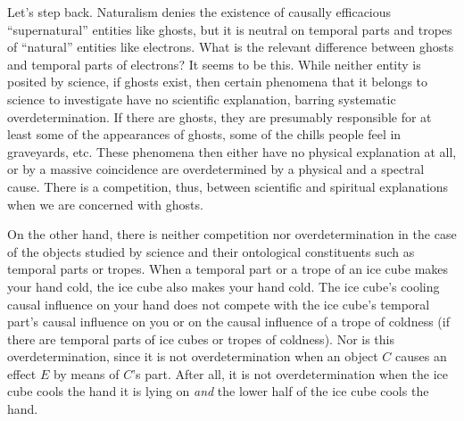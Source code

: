 Let's step back. Naturalism denies the existence of causally efficacious ``supernatural'' entities like 
ghosts, but it is neutral on temporal parts and tropes of ``natural'' entities like electrons. 
What is the relevant difference between ghosts and temporal parts of electrons? It seems to be this. While
neither entity is posited by science, if ghosts exist, then certain phenomena that it belongs to science 
to investigate have no scientific explanation, barring systematic overdetermination. If there are ghosts,
they are presumably responsible for at least some of the appearances of ghosts, some of the chills people
feel in graveyards, etc. These phenomena then either have no physical explanation at all, or by a massive
coincidence are overdetermined by a physical and a spectral cause. There is a competition, thus, between 
scientific and spiritual explanations when we are concerned with ghosts. 

On the other hand, there is neither
competition nor overdetermination in the case of the objects studied by science and their ontological
constituents such as temporal parts or tropes. When a temporal part or a trope of an ice cube makes 
your hand cold, the ice cube also makes your hand cold. The ice cube's cooling causal influence on your hand
does not compete with the ice cube's temporal part's causal influence on you or on the causal influence of 
a trope of coldness (if there are temporal parts of ice cubes or tropes of coldness). Nor is this overdetermination,
since it is not overdetermination when an object $C$ causes an effect $E$ by means of $C$'s part. After all,
it is not overdetermination when the ice cube cools the hand it is lying on \textit{and} the lower half of 
the ice cube cools the hand. 

